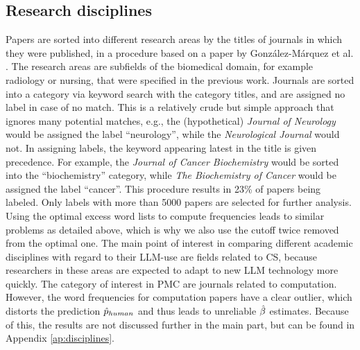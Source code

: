 \subsection{Research disciplines}
Papers are sorted into different research areas by the titles of journals in which they were published, in a procedure based on a paper by González-Márquez et al. \cite{gonzalez2024landscape}.
The research areas are subfields of the biomedical domain, for example radiology or nursing, that were specified in the previous work.
Journals are sorted into a category via keyword search with the category titles, and are assigned no label in case of no match.
This is a relatively crude but simple approach that ignores many potential matches, e.g., the (hypothetical) \emph{Journal of Neurology} would be assigned the label ``neurology'', while the \emph{Neurological Journal} would not. 
In assigning labels, the keyword appearing latest in the title is given precedence. 
For example, the \emph{Journal of Cancer Biochemistry} would be sorted into the ``biochemistry'' category, while \emph{The Biochemistry of Cancer} would be assigned the label ``cancer''.
This procedure results in 23\% of papers being labeled.
Only labels with more than 5000 papers are selected for further analysis.
Using the optimal excess word lists to compute frequencies leads to similar problems as detailed above, which is why we also use the cutoff twice removed from the optimal one.
The main point of interest in comparing different academic disciplines with regard to their LLM-use are fields related to CS, because researchers in these areas are expected to adapt to new LLM technology more quickly.
The category of interest in PMC are journals related to computation.
However, the word frequencies for computation papers have a clear outlier, which distorts the prediction $\hat{p}_{human}$ and thus leads to unreliable $\hat{\beta}$ estimates.
Because of this, the results are not discussed further in the main part, but can be found in Appendix \ref{ap:disciplines}.